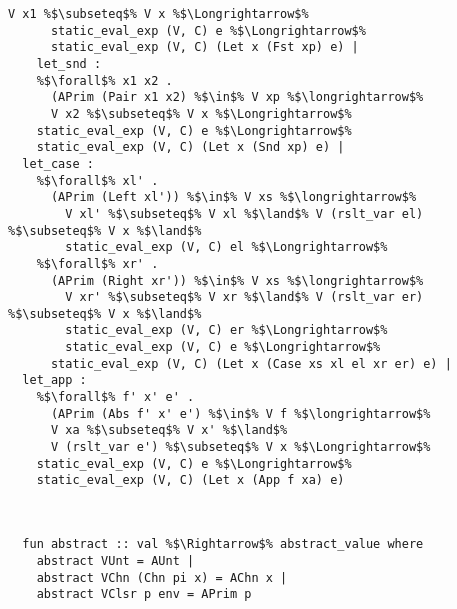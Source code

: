 \documentclass{article}
\begin{document}
\begin{lstlisting}[style=codestyle1, escapechar=\%]
        V x1 %$\subseteq$% V x %$\Longrightarrow$% 
      static_eval_exp (V, C) e %$\Longrightarrow$% 
      static_eval_exp (V, C) (Let x (Fst xp) e) |
    let_snd : 
    %$\forall$% x1 x2 .
      (APrim (Pair x1 x2) %$\in$% V xp %$\longrightarrow$%
      V x2 %$\subseteq$% V x %$\Longrightarrow$% 
    static_eval_exp (V, C) e %$\Longrightarrow$% 
    static_eval_exp (V, C) (Let x (Snd xp) e) |
  let_case :
    %$\forall$% xl' .
      (APrim (Left xl')) %$\in$% V xs %$\longrightarrow$%
        V xl' %$\subseteq$% V xl %$\land$% V (rslt_var el) %$\subseteq$% V x %$\land$%
        static_eval_exp (V, C) el %$\Longrightarrow$%
    %$\forall$% xr' .
      (APrim (Right xr')) %$\in$% V xs %$\longrightarrow$%
        V xr' %$\subseteq$% V xr %$\land$% V (rslt_var er) %$\subseteq$% V x %$\land$%
        static_eval_exp (V, C) er %$\Longrightarrow$%
        static_eval_exp (V, C) e %$\Longrightarrow$% 
      static_eval_exp (V, C) (Let x (Case xs xl el xr er) e) |
  let_app :
    %$\forall$% f' x' e' .
      (APrim (Abs f' x' e') %$\in$% V f %$\longrightarrow$%
      V xa %$\subseteq$% V x' %$\land$%
      V (rslt_var e') %$\subseteq$% V x %$\Longrightarrow$% 
    static_eval_exp (V, C) e %$\Longrightarrow$% 
    static_eval_exp (V, C) (Let x (App f xa) e)

  \end{lstlisting}
\begin{lstlisting}[style=codestyle1, escapechar=\%]


  fun abstract :: val %$\Rightarrow$% abstract_value where
    abstract VUnt = AUnt |
    abstract VChn (Chn pi x) = AChn x |
    abstract VClsr p env = APrim p

  \end{lstlisting}
\end{document}
